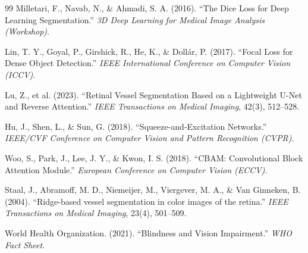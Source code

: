 \documentclass[11pt]{article}
\begin{document}
\begin{thebibliography}{99}
Milletari, F., Navab, N., \& Ahmadi, S. A. (2016).
``The Dice Loss for Deep Learning Segmentation.''
\textit{3D Deep Learning for Medical Image Analysis (Workshop)}.

Lin, T. Y., Goyal, P., Girshick, R., He, K., \& Dollár, P. (2017).
``Focal Loss for Dense Object Detection.''
\textit{IEEE International Conference on Computer Vision (ICCV)}.

Lu, Z., et al. (2023).
``Retinal Vessel Segmentation Based on a Lightweight U-Net and Reverse Attention.''
\textit{IEEE Transactions on Medical Imaging}, 42(3), 512--528.

Hu, J., Shen, L., \& Sun, G. (2018).
``Squeeze-and-Excitation Networks.''
\textit{IEEE/CVF Conference on Computer Vision and Pattern Recognition (CVPR)}.

Woo, S., Park, J., Lee, J. Y., \& Kwon, I. S. (2018).
``CBAM: Convolutional Block Attention Module.''
\textit{European Conference on Computer Vision (ECCV)}.

Staal, J., Abramoff, M. D., Niemeijer, M., Viergever, M. A., \& Van Ginneken, B. (2004).
``Ridge-based vessel segmentation in color images of the retina.''
\textit{IEEE Transactions on Medical Imaging}, 23(4), 501--509.

World Health Organization. (2021).
``Blindness and Vision Impairment.''
\textit{WHO Fact Sheet}.

\end{thebibliography}
\end{document}
